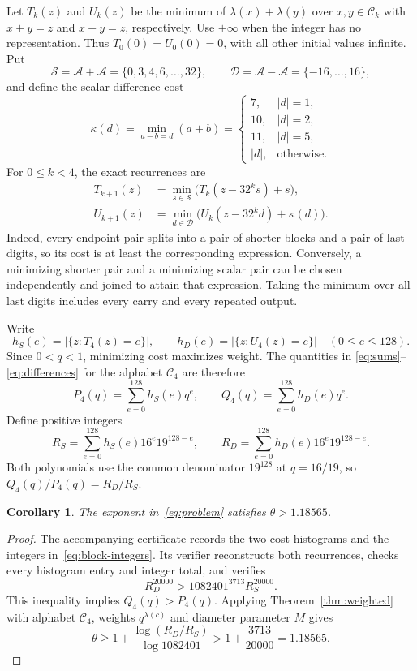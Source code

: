 \documentclass[11pt,a4paper]{article}
\newtheorem{corollary}[theorem]{Corollary}
\newcommand{\A}{\mathcal A}
\begin{document}
Let $T_k(z)$ and $U_k(z)$ be the minimum of $\lambda(x)+\lambda(y)$ over
$x,y\in\mathcal C_k$ with $x+y=z$ and $x-y=z$, respectively. Use $+\infty$
when the integer has no representation. Thus $T_0(0)=U_0(0)=0$, with
all other initial values infinite. Put
\[
 \mathcal S=\A+\A=\{0,3,4,6,\ldots,32\},
 \qquad
 \mathcal D=\A-\A=\{-16,\ldots,16\},
\]
and define the scalar difference cost
\[
 \kappa(d)=\min_{a-b=d}(a+b)
 =\begin{cases}
   7,& |d|=1,\\
   10,& |d|=2,\\
   11,& |d|=5,\\
   |d|,&\text{otherwise}.
 \end{cases}
\]
For $0\le k<4$, the exact recurrences are
\begin{align}
 T_{k+1}(z)&=\min_{s\in\mathcal S}\bigl(T_k(z-32^ks)+s\bigr),
 \label{eq:block-sum-recurrence}\\
 U_{k+1}(z)&=\min_{d\in\mathcal D}\bigl(U_k(z-32^kd)+\kappa(d)\bigr).
 \label{eq:block-difference-recurrence}
\end{align}
Indeed, every endpoint pair splits into a pair of shorter blocks and a
pair of last digits, so its cost is at least the corresponding expression.
Conversely, a minimizing shorter pair and a minimizing scalar pair can be
chosen independently and joined to attain that expression. Taking the
minimum over all last digits includes every carry and every repeated output.

Write
\[
 h_S(e)=|\{z:T_4(z)=e\}|,
 \qquad h_D(e)=|\{z:U_4(z)=e\}| \quad (0\le e\le128).
\]
Since $0<q<1$, minimizing cost maximizes weight. The quantities in
\eqref{eq:sums}--\eqref{eq:differences} for the alphabet $\mathcal C_4$
are therefore
\begin{equation}\label{eq:block-polynomials}
 P_4(q)=\sum_{e=0}^{128}h_S(e)q^e,
 \qquad Q_4(q)=\sum_{e=0}^{128}h_D(e)q^e.
\end{equation}
Define positive integers
\begin{equation}\label{eq:block-integers}
 R_S=\sum_{e=0}^{128}h_S(e)16^e19^{128-e},
 \qquad R_D=\sum_{e=0}^{128}h_D(e)16^e19^{128-e}.
\end{equation}
Both polynomials use the common denominator $19^{128}$ at $q=16/19$,
so $Q_4(q)/P_4(q)=R_D/R_S$.

\begin{corollary}\label{cor:headline}
The exponent in~\eqref{eq:problem} satisfies $\theta>1.18565$.
\end{corollary}
\begin{proof}
The accompanying certificate records the two cost histograms and the
integers in~\eqref{eq:block-integers}. Its verifier reconstructs both
recurrences, checks every histogram entry and integer total, and verifies
\begin{equation}\label{eq:block-certificate}
 R_D^{20000}>1082401^{3713}R_S^{20000}.
\end{equation}
This inequality implies $Q_4(q)>P_4(q)$. Applying
Theorem~\ref{thm:weighted} with alphabet $\mathcal C_4$, weights
$q^{\lambda(c)}$ and diameter parameter $M$ gives
\[
 \theta\ge1+\frac{\log(R_D/R_S)}{\log1082401}
 >1+\frac{3713}{20000}=1.18565.
\]
\end{proof}
\end{document}
